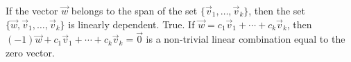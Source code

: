 {If the vector $\vec{w}$ belongs to the span of the set $\{\vec{v}_1,\ldots, \vec{v}_k\}$, then the set $\{\vec{w},\vec{v}_1,\ldots, \vec{v}_k\}$ is linearly dependent.}
{True. If $\vec{w} = c_1\vec{v}_1+\cdots + c_k\vec{v}_k$, then $(-1)\vec{w}+c_1\vec{v}_1+\cdots +c_k\vec{v}_k=\vec{0}$ is a non-trivial linear combination equal to the zero vector.}